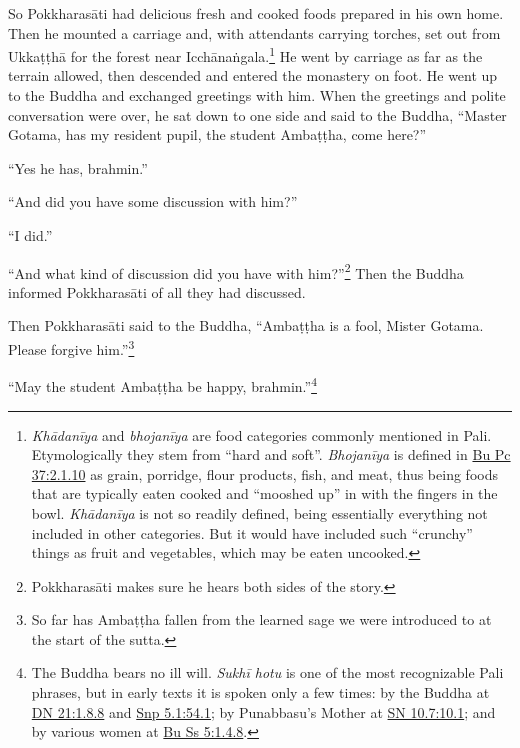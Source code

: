 \documentclass[12pt,openany]{book}%
\begin{document}
So \textsanskrit{Pokkharasāti} had delicious fresh and cooked foods prepared in his own home. Then he mounted a carriage and, with attendants carrying torches, set out from \textsanskrit{Ukkaṭṭhā} for the forest near \textsanskrit{Icchānaṅgala}.\footnote{\textit{\textsanskrit{Khādanīya}} and \textit{\textsanskrit{bhojanīya}} are food categories commonly mentioned in Pali. Etymologically they stem from “hard and soft”. \textit{\textsanskrit{Bhojanīya}} is defined in \href{https://suttacentral.net/pli-tv-bu-vb-pc37/en/sujato\#2.1.10}{Bu Pc 37:2.1.10} as grain, porridge, flour products, fish, and meat, thus being foods that are typically eaten cooked and “mooshed up” in with the fingers in the bowl. \textit{\textsanskrit{Khādanīya}} is not so readily defined, being essentially everything not included in other categories. But it would have included such “crunchy” things as fruit and vegetables, which may be eaten uncooked. } He went by carriage as far as the terrain allowed, then descended and entered the monastery on foot. He went up to the Buddha and exchanged greetings with him. When the greetings and polite conversation were over, he sat down to one side and said to the Buddha, “Master Gotama, has my resident pupil, the student \textsanskrit{Ambaṭṭha}, come here?” 

“Yes he has, brahmin.” 

“And did you have some discussion with him?” 

“I did.” 

“And what kind of discussion did you have with him?”\footnote{\textsanskrit{Pokkharasāti} makes sure he hears both sides of the story. } Then the Buddha informed \textsanskrit{Pokkharasāti} of all they had discussed. 

Then \textsanskrit{Pokkharasāti} said to the Buddha, “\textsanskrit{Ambaṭṭha} is a fool, Mister Gotama. Please forgive him.”\footnote{So far has \textsanskrit{Ambaṭṭha} fallen from the learned sage we were introduced to at the start of the sutta. } 

“May the student \textsanskrit{Ambaṭṭha} be happy, brahmin.”\footnote{The Buddha bears no ill will. \textit{\textsanskrit{Sukhī} hotu} is one of the most recognizable Pali phrases, but in early texts it is spoken only a few times: by the Buddha at \href{https://suttacentral.net/dn21/en/sujato\#1.8.8}{DN 21:1.8.8} and \href{https://suttacentral.net/snp5.1/en/sujato\#54.1}{Snp 5.1:54.1}; by Punabbasu’s Mother at \href{https://suttacentral.net/sn10.7/en/sujato\#10.1}{SN 10.7:10.1}; and by various women at \href{https://suttacentral.net/pli-tv-bu-vb-ss5/en/sujato\#1.4.8}{Bu Ss 5:1.4.8}. } 
\end{document}
